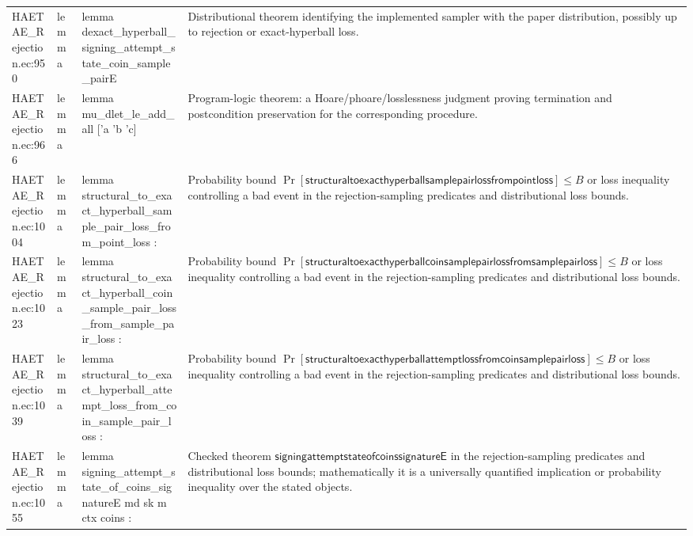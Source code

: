 \documentclass[10pt]{article}
\begin{document}
\begin{longtable}{L{0.11\textwidth}L{0.055\textwidth}L{0.385\textwidth}L{0.41\textwidth}}
HAETAE\_\allowbreak{}Rejection.\allowbreak{}ec:\allowbreak{}950 & lemma & {\ttfamily\scriptsize lemma dexact\_\allowbreak{}hyperball\_\allowbreak{}signing\_\allowbreak{}attempt\_\allowbreak{}state\_\allowbreak{}coin\_\allowbreak{}sample\_\allowbreak{}pairE} & Distributional theorem identifying the implemented sampler with the paper distribution, possibly up to rejection or exact-hyperball loss. \\
HAETAE\_\allowbreak{}Rejection.\allowbreak{}ec:\allowbreak{}966 & lemma & {\ttfamily\scriptsize lemma mu\_\allowbreak{}dlet\_\allowbreak{}le\_\allowbreak{}add\_\allowbreak{}all ['a 'b 'c]} & Program-logic theorem: a Hoare/phoare/losslessness judgment proving termination and postcondition preservation for the corresponding procedure. \\
HAETAE\_\allowbreak{}Rejection.\allowbreak{}ec:\allowbreak{}1004 & lemma & {\ttfamily\scriptsize lemma structural\_\allowbreak{}to\_\allowbreak{}exact\_\allowbreak{}hyperball\_\allowbreak{}sample\_\allowbreak{}pair\_\allowbreak{}loss\_\allowbreak{}from\_\allowbreak{}point\_\allowbreak{}loss :} & Probability bound $\Pr[\mathsf{structuraltoexacthyperballsamplepairlossfrompointloss}]\le B$ or loss inequality controlling a bad event in the rejection-sampling predicates and distributional loss bounds. \\
HAETAE\_\allowbreak{}Rejection.\allowbreak{}ec:\allowbreak{}1023 & lemma & {\ttfamily\scriptsize lemma structural\_\allowbreak{}to\_\allowbreak{}exact\_\allowbreak{}hyperball\_\allowbreak{}coin\_\allowbreak{}sample\_\allowbreak{}pair\_\allowbreak{}loss\_\allowbreak{}from\_\allowbreak{}sample\_\allowbreak{}pair\_\allowbreak{}loss :} & Probability bound $\Pr[\mathsf{structuraltoexacthyperballcoinsamplepairlossfromsamplepairloss}]\le B$ or loss inequality controlling a bad event in the rejection-sampling predicates and distributional loss bounds. \\
HAETAE\_\allowbreak{}Rejection.\allowbreak{}ec:\allowbreak{}1039 & lemma & {\ttfamily\scriptsize lemma structural\_\allowbreak{}to\_\allowbreak{}exact\_\allowbreak{}hyperball\_\allowbreak{}attempt\_\allowbreak{}loss\_\allowbreak{}from\_\allowbreak{}coin\_\allowbreak{}sample\_\allowbreak{}pair\_\allowbreak{}loss :} & Probability bound $\Pr[\mathsf{structuraltoexacthyperballattemptlossfromcoinsamplepairloss}]\le B$ or loss inequality controlling a bad event in the rejection-sampling predicates and distributional loss bounds. \\
HAETAE\_\allowbreak{}Rejection.\allowbreak{}ec:\allowbreak{}1055 & lemma & {\ttfamily\scriptsize lemma signing\_\allowbreak{}attempt\_\allowbreak{}state\_\allowbreak{}of\_\allowbreak{}coins\_\allowbreak{}signatureE md sk m ctx coins :} & Checked theorem $\mathsf{signingattemptstateofcoinssignatureE}$ in the rejection-sampling predicates and distributional loss bounds; mathematically it is a universally quantified implication or probability inequality over the stated objects. \\

\end{longtable}
\end{document}
